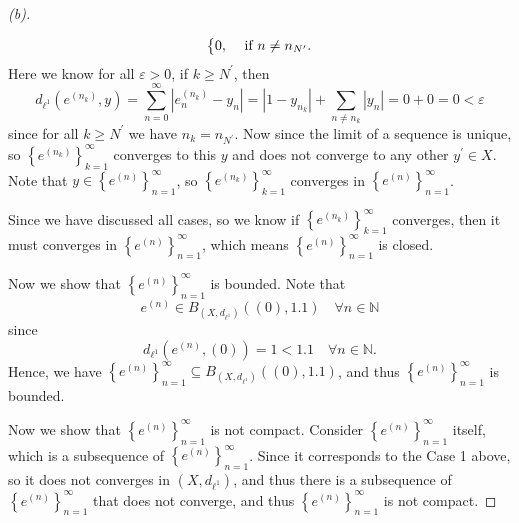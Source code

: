 \begin{proof}[(b)]
\begin{itemize}
\[\begin{dcases}
        0, &\text{ if } n \neq n_{N^{\prime} }.
      \end{dcases}
    \]
    Here we know for all \(\varepsilon > 0\), if \(k \ge N^{\prime} \), then 
    \[
      d_{\ell ^1} \left( e^{(n_k)}, y \right) = \sum_{n=0}^{\infty} \left\vert e_n^{(n_k)} - y_n \right\vert = \left\vert 1 - y_{n_k} \right\vert + \sum_{n \neq n_k}\left\vert y_n \right\vert = 0 + 0 = 0 < \varepsilon   
    \] since for all \(k \ge N^{\prime} \) we have \(n_k = n_{N^{\prime} }\). Now since the limit of a sequence is unique, so \(\left\{ e^{(n_k)} \right\}_{k=1}^{\infty}  \) converges to this \(y\) and does not converge to any other \(y^{\prime} \in X\). Note that \(y \in \left\{ e^{(n)} \right\}_{n=1}^{\infty}  \), so \(\left\{ e^{(n_k)} \right\}_{k=1}^{\infty}  \) converges in \(\left\{ e^{(n)} \right\}_{n=1}^{\infty}  \).      
  \end{itemize} 
  Since we have discussed all cases, so we know if \(\left\{ e^{(n_k)} \right\}_{k=1}^{\infty}  \) converges, then it must converges in \(\left\{ e^{(n)} \right\}_{n=1}^{\infty}  \), which means \(\left\{ e^{(n)} \right\}_{n=1}^{\infty}  \) is closed. 
  
  Now we show that \(\left\{ e^{(n)} \right\}_{n=1}^{\infty}  \) is bounded. Note that 
  \[
    e^{(n)} \in B_{\left( X, d_{\ell ^1} \right) } \left( (0), 1.1 \right) \quad \forall n \in \mathbb{N}  
  \] since 
  \[
    d_{\ell ^1} \left( e^{(n)}, (0) \right) = 1 < 1.1 \quad \forall n \in \mathbb{N} .
  \]
  Hence, we have \(\left\{ e^{(n)} \right\}_{n=1}^{\infty} \subseteq B_{\left( X, d_{\ell ^1} \right) } \left( (0), 1.1 \right) \), and thus \(\left\{ e^{(n)} \right\}_{n=1}^{\infty}  \) is bounded. 
  
  Now we show that \(\left\{ e^{(n)} \right\}_{n=1}^{\infty}  \) is not compact. Consider \(\left\{ e^{(n)} \right\}_{n=1}^{\infty}  \) itself, which is a subsequence of \(\left\{ e^{(n)} \right\}_{n=1}^{\infty}  \). Since it corresponds to the Case 1 above, so it does not converges in \((X, d_{\ell ^1})\), and thus there is a subsequence of \(\left\{ e^{(n)} \right\}_{n=1}^{\infty}  \) that does not converge, and thus \(\left\{ e^{(n)} \right\}_{n=1}^{\infty}  \) is not compact.    
\end{proof}

